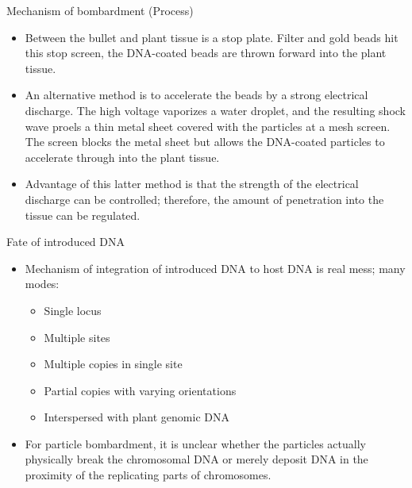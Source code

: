 \documentclass[ignorenonframetext,aspectratio=169]{beamer}
\providecommand{\tightlist}{%
  \setlength{\itemsep}{0pt}\setlength{\parskip}{0pt}}
\begin{document}
\begin{frame}{Mechanism of bombardment (Process)}
\protect\hypertarget{mechanism-of-bombardment-process-1}{}

\begin{itemize}
\tightlist
\item
  Between the bullet and plant tissue is a stop plate. Filter and gold
  beads hit this stop screen, the DNA-coated beads are thrown forward
  into the plant tissue.
\item
  An alternative method is to accelerate the beads by a strong
  electrical discharge. The high voltage vaporizes a water droplet, and
  the resulting shock wave proels a thin metal sheet covered with the
  particles at a mesh screen. The screen blocks the metal sheet but
  allows the DNA-coated particles to accelerate through into the plant
  tissue.
\item
  Advantage of this latter method is that the strength of the electrical
  discharge can be controlled; therefore, the amount of penetration into
  the tissue can be regulated.
\end{itemize}

\end{frame}

\begin{frame}{Fate of introduced DNA}
\protect\hypertarget{fate-of-introduced-dna}{}

\begin{itemize}
\tightlist
\item
  Mechanism of integration of introduced DNA to host DNA is real mess;
  many modes:

  \begin{itemize}
  \tightlist
  \item
    Single locus
  \item
    Multiple sites
  \item
    Multiple copies in single site
  \item
    Partial copies with varying orientations
  \item
    Interspersed with plant genomic DNA
  \end{itemize}
\item
  For particle bombardment, it is unclear whether the particles actually
  physically break the chromosomal DNA or merely deposit DNA in the
  proximity of the replicating parts of chromosomes.
\end{itemize}

\end{frame}
\end{document}
